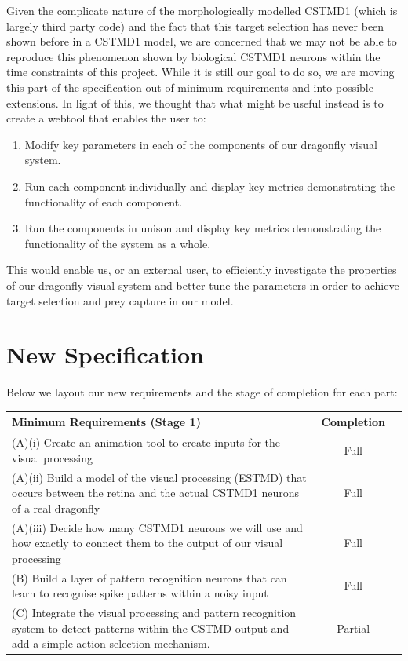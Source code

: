 \documentclass[a4paper,11pt]{article}
\begin{document}
Given the complicate nature of the morphologically modelled CSTMD1 (which is largely third party code) and the fact that this target selection has never been shown before in a CSTMD1 model, we are concerned that we may not be able to reproduce this phenomenon shown by biological CSTMD1 neurons within the time constraints of this project. While it is still our goal to do so, we are moving this part of the specification out of minimum requirements and into possible extensions.
In light of this, we thought that what might be useful instead is to create a webtool that enables the user to:
\begin{enumerate}
	\item Modify key parameters in each of the components of our dragonfly visual system.
	\item Run each component individually and display key metrics demonstrating the functionality of each component.
	\item Run the components in unison and display key metrics demonstrating the functionality of the system as a whole.
\end{enumerate}
This would enable us, or an external user, to efficiently investigate the properties of our dragonfly visual system and better tune the parameters in order to achieve target selection and prey capture in our model.

\section{New Specification}
Below we layout our new requirements and the stage of completion for each part:
\begin{center}
    \begin{tabular}{p{12cm} c c}
    \textbf{Minimum Requirements (Stage 1)} & \textbf{Completion} \\ \hline
    (A)(i) Create an animation tool to create inputs for the visual processing & Full \\ 
	(A)(ii) Build a model of the visual processing (ESTMD) that occurs between the retina and the actual CSTMD1 neurons of a real dragonfly & Full \\
	(A)(iii) Decide how many CSTMD1 neurons we will use and how exactly to connect them to the output of our visual processing & Full \\
	(B) Build a layer of pattern recognition neurons that can learn to recognise spike patterns within a noisy input & Full\\
	(C) Integrate the visual processing and pattern recognition system to detect patterns within the CSTMD output and add a simple action-selection mechanism. & Partial\\
    \end{tabular}
\end{center}
\end{document}
